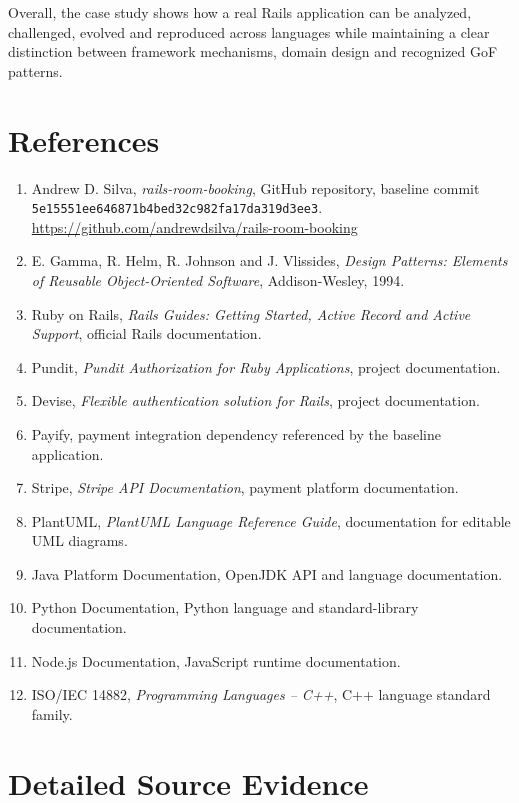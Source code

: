 \documentclass[10pt,a4paper]{article}
\newcommand{\code}[1]{\texttt{\small #1}}
\newcommand{\repo}{\url{https://github.com/andrewdsilva/rails-room-booking}}
\newcommand{\baseline}{\code{5e15551ee646871b4bed32c982fa17da319d3ee3}}
\begin{document}
Overall, the case study shows how a real Rails application can be analyzed, challenged, evolved and reproduced across languages while maintaining a clear distinction between framework mechanisms, domain design and recognized GoF patterns.

\section{References}

\begin{enumerate}[leftmargin=*]
\item Andrew D. Silva, \emph{rails-room-booking}, GitHub repository, baseline commit \baseline. \repo
\item E. Gamma, R. Helm, R. Johnson and J. Vlissides, \emph{Design Patterns: Elements of Reusable Object-Oriented Software}, Addison-Wesley, 1994.
\item Ruby on Rails, \emph{Rails Guides: Getting Started, Active Record and Active Support}, official Rails documentation.
\item Pundit, \emph{Pundit Authorization for Ruby Applications}, project documentation.
\item Devise, \emph{Flexible authentication solution for Rails}, project documentation.
\item Payify, payment integration dependency referenced by the baseline application.
\item Stripe, \emph{Stripe API Documentation}, payment platform documentation.
\item PlantUML, \emph{PlantUML Language Reference Guide}, documentation for editable UML diagrams.
\item Java Platform Documentation, OpenJDK API and language documentation.
\item Python Documentation, Python language and standard-library documentation.
\item Node.js Documentation, JavaScript runtime documentation.
\item ISO/IEC 14882, \emph{Programming Languages -- C++}, C++ language standard family.
\end{enumerate}

\appendix
\section{Detailed Source Evidence}
\end{document}

